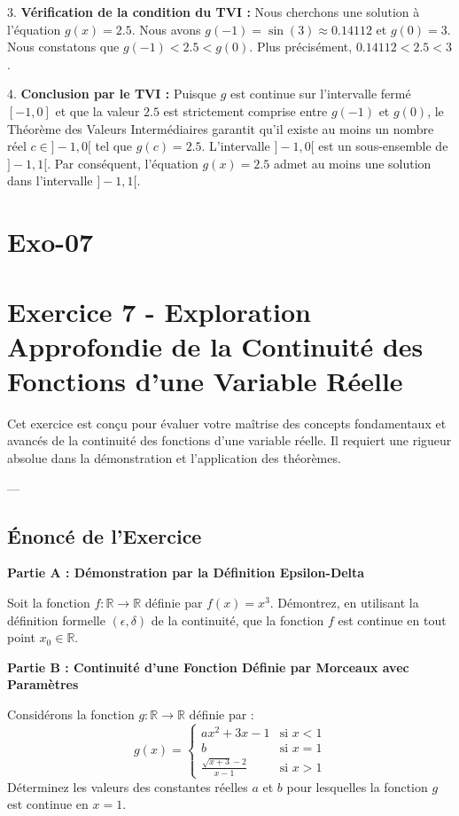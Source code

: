 \documentclass[12pt,a4paper]{report}
\begin{document}
3.  \textbf{Vérification de la condition du TVI :}
    Nous cherchons une solution à l'équation $g(x) = 2.5$.
    Nous avons $g(-1) = \sin(3) \approx 0.14112$ et $g(0) = 3$.
    Nous constatons que $g(-1) < 2.5 < g(0)$.
    Plus précisément, $0.14112 < 2.5 < 3$.

4.  \textbf{Conclusion par le TVI :}
    Puisque $g$ est continue sur l'intervalle fermé $[-1, 0]$ et que la valeur $2.5$ est strictement comprise entre $g(-1)$ et $g(0)$, le Théorème des Valeurs Intermédiaires garantit qu'il existe au moins un nombre réel $c \in ]-1, 0[$ tel que $g(c) = 2.5$.
    L'intervalle $]-1, 0[$ est un sous-ensemble de $]-1, 1[$.
    Par conséquent, l'équation $g(x) = 2.5$ admet au moins une solution dans l'intervalle $]-1, 1[$.

\section{Exo-07}
\section{Exercice 7 - Exploration Approfondie de la Continuité des Fonctions d'une Variable Réelle}

Cet exercice est conçu pour évaluer votre maîtrise des concepts fondamentaux et avancés de la continuité des fonctions d'une variable réelle. Il requiert une rigueur absolue dans la démonstration et l'application des théorèmes.

---

\subsection{Énoncé de l'Exercice}

\textbf{Partie A : Démonstration par la Définition Epsilon-Delta}

Soit la fonction $f: \mathbb{R} \to \mathbb{R}$ définie par $f(x) = x^3$.
Démontrez, en utilisant la définition formelle $(\epsilon, \delta)$ de la continuité, que la fonction $f$ est continue en tout point $x_0 \in \mathbb{R}$.

\textbf{Partie B : Continuité d'une Fonction Définie par Morceaux avec Paramètres}

Considérons la fonction $g: \mathbb{R} \to \mathbb{R}$ définie par :
$$
g(x) = \begin{cases}
ax^2 + 3x - 1 & \text{si } x < 1 \\
b & \text{si } x = 1 \\
\frac{\sqrt{x+3}-2}{x-1} & \text{si } x > 1
\end{cases}
$$
Déterminez les valeurs des constantes réelles $a$ et $b$ pour lesquelles la fonction $g$ est continue en $x=1$.
\end{document}
